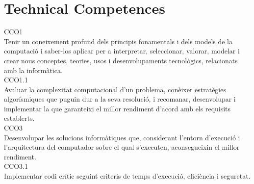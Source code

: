 
\chapter{Technical Competences} %

\label{Chapter5} %

CCO1\\
Tenir un coneixement profund dels principis fonamentals i dels models de la computació i saber-los aplicar per a interpretar, seleccionar, valorar, modelar i crear nous conceptes, teories, usos i desenvolupaments tecnològics, relacionats amb la informàtica.\\
CCO1.1\\
Avaluar la complexitat computacional d'un problema, conèixer estratègies algorísmiques que puguin dur a la seva resolució, i recomanar, desenvolupar i implementar la que garanteixi el millor rendiment d'acord amb els requisits establerts.\\


CCO3\\

Desenvolupar les solucions informàtiques que, considerant l'entorn d'execució i l'arquitectura del computador sobre el qual s'executen, aconsegueixin el millor rendiment.\\

CCO3.1\\

Implementar codi crític seguint criteris de temps d'execució, eficiència i seguretat.